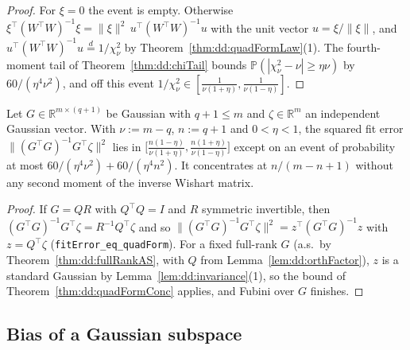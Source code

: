 \begin{proof}
  \leanok
For $\xi=0$ the event is empty. Otherwise $\xi^\top(W^\top W)^{-1}\xi=\|\xi\|^2\,u^\top(W^\top W)^{-1}u$ with the unit vector $u=\xi/\|\xi\|$, and $u^\top(W^\top W)^{-1}u\overset d=1/\chi^2_\nu$ by Theorem~\ref{thm:dd:quadFormLaw}(1). The fourth-moment tail of Theorem~\ref{thm:dd:chiTail} bounds
$\mathbb P(|\chi^2_\nu-\nu|\ge\eta\nu)$ by $60/(\eta^4\nu^2)$, and off this event $1/\chi^2_\nu\in[\frac1{\nu(1+\eta)},\frac1{\nu(1-\eta)}]$.
\end{proof}

\begin{theorem}\label{thm:dd:fitError}
  \leanok
Let $G\in\mathbb R^{m\times(q+1)}$ be Gaussian with $q+1\le m$ and $\zeta\in\mathbb R^m$ an independent Gaussian vector. With $\nu:=m-q$, $n:=q+1$ and $0<\eta<1$, the squared fit error
$\|(G^\top G)^{-1}G^\top\zeta\|^2$ lies in $\bigl[\tfrac{n(1-\eta)}{\nu(1+\eta)},\tfrac{n(1+\eta)}{\nu(1-\eta)}\bigr]$ except on an event of probability at most
$60/(\eta^4\nu^2)+60/(\eta^4n^2)$. It concentrates at $n/(m-n+1)$ without any second moment of the inverse Wishart matrix.
\end{theorem}

\begin{proof}
  \leanok
If $G=QR$ with $Q^\top Q=I$ and $R$ symmetric invertible, then $(G^\top G)^{-1}G^\top\zeta=R^{-1}Q^\top\zeta$ and so $\|(G^\top G)^{-1}G^\top\zeta\|^2=z^\top(G^\top G)^{-1}z$ with $z=Q^\top\zeta$
(\texttt{fitError\_eq\_quadForm}). For a fixed full-rank $G$ (a.s.\ by Theorem~\ref{thm:dd:fullRankAS}, with $Q$ from Lemma~\ref{lem:dd:orthFactor}), $z$ is a standard Gaussian by Lemma~\ref{lem:dd:invariance}(1), so the bound of Theorem~\ref{thm:dd:quadFormConc}
applies, and Fubini over $G$ finishes.
\end{proof}

\subsection{Bias of a Gaussian subspace}

